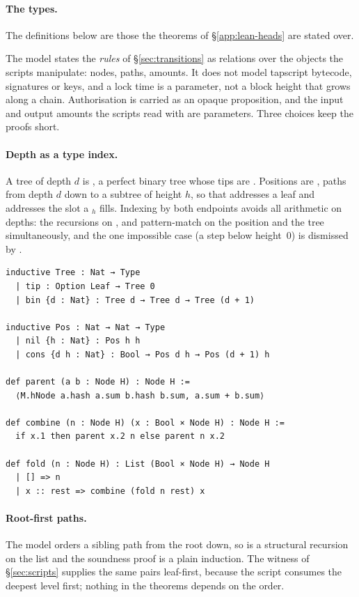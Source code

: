 \paragraph{The types.} The definitions below are those the theorems of \S\ref{app:lean-heads} are stated over.

The model states the \emph{rules} of \S\ref{sec:transitions} as
relations over the objects the scripts manipulate: nodes, paths, amounts.
It does not model tapscript bytecode, signatures or keys, and a lock time
is a parameter, not a block height that grows along a chain.
Authorisation is carried as an opaque proposition, and the input and
output amounts the scripts read with  are parameters. Three
choices keep the proofs short.

\paragraph{Depth as a type index.} A tree of depth $d$ is
, a perfect binary tree whose tips are .
Positions are , paths from depth $d$ down to a subtree of
height $h$, so that  addresses a leaf and 
addresses the slot a $_h$ fills. Indexing by both endpoints
avoids all arithmetic on depths: the recursions on ,
 and  pattern-match on the position and the
tree simultaneously, and the one impossible case (a  step below
height~$0$) is dismissed by .

\begin{lstlisting}
inductive Tree : Nat → Type
  | tip : Option Leaf → Tree 0
  | bin {d : Nat} : Tree d → Tree d → Tree (d + 1)

inductive Pos : Nat → Nat → Type
  | nil {h : Nat} : Pos h h
  | cons {d h : Nat} : Bool → Pos d h → Pos (d + 1) h

def parent (a b : Node H) : Node H :=
  ⟨M.hNode a.hash a.sum b.hash b.sum, a.sum + b.sum⟩

def combine (n : Node H) (x : Bool × Node H) : Node H :=
  if x.1 then parent x.2 n else parent n x.2

def fold (n : Node H) : List (Bool × Node H) → Node H
  | [] => n
  | x :: rest => combine (fold n rest) x
\end{lstlisting}

\paragraph{Root-first paths.} The model orders a sibling path from the
root down, so  is a structural recursion on the list and the
soundness proof is a plain induction. The witness of \S\ref{sec:scripts}
supplies the same pairs leaf-first, because the script consumes the
deepest level first; nothing in the theorems depends on the order.


